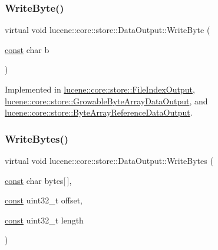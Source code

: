 \mbox{\label{classlucene_1_1core_1_1store_1_1DataOutput_a22e242cc11ebfc3e7937eacb07106626}} 
\subsubsection{\texorpdfstring{Write\+Byte()}{WriteByte()}}
{\footnotesize\ttfamily virtual void lucene\+::core\+::store\+::\+Data\+Output\+::\+Write\+Byte (\begin{DoxyParamCaption}\item[{\mbox{\hyperlink{ZlibCrc32_8h_a2c212835823e3c54a8ab6d95c652660e}{const}} char}]{b }\end{DoxyParamCaption})\hspace{0.3cm}{\ttfamily [pure virtual]}}



Implemented in \mbox{\hyperlink{classlucene_1_1core_1_1store_1_1FileIndexOutput_a7fc2cf6d26931a835104c772b59ffde8}{lucene\+::core\+::store\+::\+File\+Index\+Output}}, \mbox{\hyperlink{classlucene_1_1core_1_1store_1_1GrowableByteArrayDataOutput_acc15bef7c843270e142e935348fa5583}{lucene\+::core\+::store\+::\+Growable\+Byte\+Array\+Data\+Output}}, and \mbox{\hyperlink{classlucene_1_1core_1_1store_1_1ByteArrayReferenceDataOutput_a8fe0203aa432ae75b9fb280414476b80}{lucene\+::core\+::store\+::\+Byte\+Array\+Reference\+Data\+Output}}.

\mbox{\label{classlucene_1_1core_1_1store_1_1DataOutput_ab2d4f729a14d87afd84ec558e11883d2}} 
\subsubsection{\texorpdfstring{Write\+Bytes()}{WriteBytes()}\hspace{0.1cm}{\footnotesize\ttfamily [1/2]}}
{\footnotesize\ttfamily virtual void lucene\+::core\+::store\+::\+Data\+Output\+::\+Write\+Bytes (\begin{DoxyParamCaption}\item[{\mbox{\hyperlink{ZlibCrc32_8h_a2c212835823e3c54a8ab6d95c652660e}{const}} char}]{bytes\mbox{[}$\,$\mbox{]},  }\item[{\mbox{\hyperlink{ZlibCrc32_8h_a2c212835823e3c54a8ab6d95c652660e}{const}} uint32\+\_\+t}]{offset,  }\item[{\mbox{\hyperlink{ZlibCrc32_8h_a2c212835823e3c54a8ab6d95c652660e}{const}} uint32\+\_\+t}]{length }\end{DoxyParamCaption})\hspace{0.3cm}{\ttfamily [pure virtual]}}



